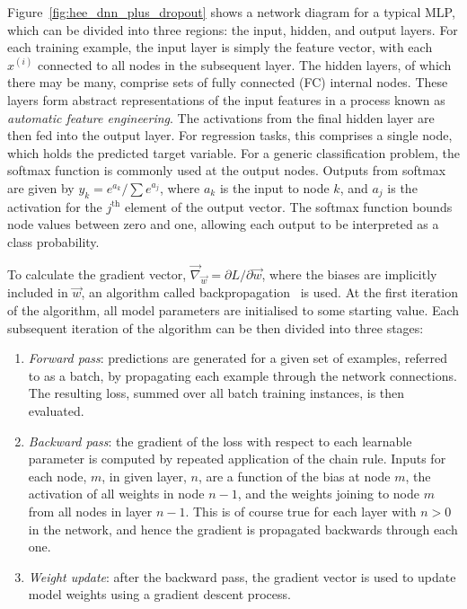 Figure~\ref{fig:hee_dnn_plus_dropout} shows a network diagram for a typical MLP, which can be divided into three regions: the input, hidden, and output layers. For each training example, the input layer is simply the feature vector, with each $x^{(i)}$ connected to all nodes in the subsequent layer. The hidden layers, of which there may be many, comprise sets of fully connected (FC) internal nodes. These layers form abstract representations of the input features in a process known as \textit{automatic feature engineering}. The activations from the final hidden layer are then fed into the output layer. For regression tasks, this comprises a single node, which holds the predicted target variable. For a generic classification problem, the softmax function is commonly used at the output nodes. Outputs from softmax are given by $y_{k}=e^{a_{k}}/\sum e^{a_{j}}$, where $a_{k}$ is the input to node $k$, and $a_{j}$ is the activation for the $j^{\mathrm{th}}$ element of the output vector. The softmax function bounds node values between zero and one, allowing each output to be interpreted as a class probability.

To calculate the gradient vector, $\vec{\nabla}_{\vec{w}}=\partial L/\partial\vec{w}$, where the biases are implicitly included in $\vec{w}$, an algorithm called backpropagation~\cite{backprop} is used. At the first iteration of the algorithm, all model parameters are initialised to some starting value. Each subsequent iteration of the algorithm can be then divided into three stages:


\begin{enumerate}
    \item \textit{Forward pass}: predictions are generated for a given set of examples, referred to as a batch, by propagating each example through the network connections. The resulting loss, summed over all batch training instances, is then evaluated.
    \item \textit{Backward pass}: the gradient of the loss with respect to each learnable parameter is computed by repeated application of the chain rule. Inputs for each node, $m$, in given layer, $n$, are a function of the bias at node $m$, the activation of all weights in node $n-1$, and the weights joining to node $m$ from all nodes in layer $n-1$. This is of course true for each layer with $n>0$ in the network, and hence the gradient is propagated backwards through each one.
    \item \textit{Weight update}: after the backward pass, the gradient vector is used to update model weights using a gradient descent process.
\end{enumerate}

